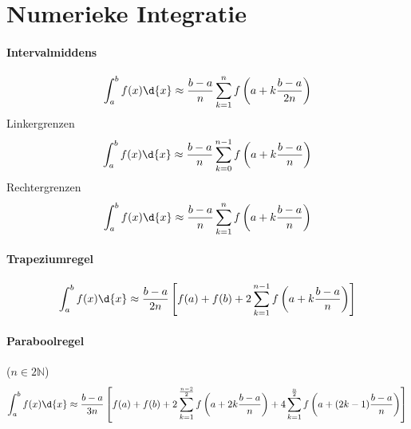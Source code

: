 \section{Numerieke Integratie}
\label{sec:NumInt}
\paragraph{Intervalmiddens}
\label{sec:NumIntMiddens}
\begin{equation}
 \int_a^b f(x)\d{x} \approx \frac{b-a}{n} \sum_{k=1}^{n} f\left(a + k\frac{b-a}{2n} \right)
\end{equation}
Linkergrenzen
\begin{equation}
 \int_a^b f(x)\d{x} \approx \frac{b-a}{n} \sum_{k=0}^{n-1} f\left(a + k\frac{b-a}{n} \right)
\end{equation}
Rechtergrenzen
\begin{equation}
 \int_a^b f(x)\d{x} \approx \frac{b-a}{n} \sum_{k=1}^{n} f\left(a + k\frac{b-a}{n} \right)
\end{equation}

\paragraph{Trapeziumregel}
\label{sec:NumIntTrapezium}
\begin{equation}
 \int_a^b f(x)\d{x} \approx \frac{b-a}{2n} \left[f(a) + f(b) + 2\sum_{k=1}^{n-1} f\left(a + k\frac{b-a}{n} \right)\right]
\end{equation}

\paragraph{Paraboolregel}
\label{sec:NumIntParabool}
($n \in 2\mathbb{N}$)
\begin{equation}
 \int_a^b f(x)\d{x} \approx \frac{b-a}{3n} \left[f(a) + f(b) + 2\sum_{k=1}^{\frac{n-2}{2}} f\left(a + 2k\frac{b-a}{n} \right)
 																														+ 4\sum_{k=1}^{\frac{n}{2}} f\left(a + (2k-1)\frac{b-a}{n} \right)\right]
\end{equation}